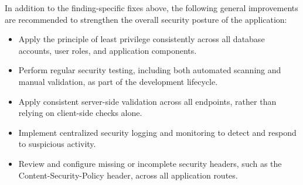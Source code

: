 In addition to the finding-specific fixes above, the following
general improvements are recommended to strengthen the overall
security posture of the application:

\begin{itemize}
    \item Apply the principle of least privilege consistently across
    all database accounts, user roles, and application components.

    \item Perform regular security testing, including both automated
    scanning and manual validation, as part of the development
    lifecycle.

    \item Apply consistent server-side validation across all
    endpoints, rather than relying on client-side checks alone.

    \item Implement centralized security logging and monitoring to
    detect and respond to suspicious activity.

    \item Review and configure missing or incomplete security headers,
    such as the Content-Security-Policy header, across all
    application routes.
\end{itemize}